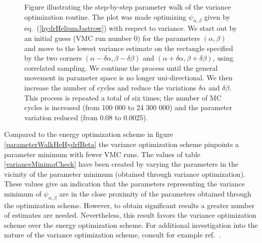 \begin{figure}[hbtp]
  
  
  \caption{ Figure illustrating the step-by-step parameter walk of the
  variance optimization routine. The plot was made optimizing
  $\psi_{\alpha,\beta}$ given by 
  eq.~(\ref{hydrHeliumJastrow}) with respect to variance.  We start out
  by an initial guess (VMC run number 0) for the parameters
  $(\alpha,\beta)$ and move to the lowest variance estimate on the
  rectangle specified by the two corners
  $(\alpha-\delta\alpha,\beta-\delta\beta)$ and
  $(\alpha+\delta\alpha,\beta+\delta\beta)$, using correlated
  sampling. We continue the process until the general movement in
  parameter space is no longer 
  uni-directional. We then increase the number of cycles and reduce
  the variations $\delta\alpha$ and $\delta\beta$. This process is
  repeated a total of six times; the number of MC cycles is increased
  (from 100 000 to 24 300 000) and the  parameter variation reduced
  (from 0.08 to 0.0025).
  }
  \label{parameterWalkHeHydrfBetaVariance}
\end{figure}

Compared to the energy optimization scheme in figure
\ref{parameterWalkHeHydrfBeta} the variance optimization scheme
pinpoints a parameter minimum with fewer VMC runs. The values of 
table \ref{varianceMinimaCheck} have been created by varying the
parameters in the vicinity of the parameter minimum (obtained through
variance optimization). These values give an indication that the 
parameters representing the variance minimum of $\psi_{\alpha,\beta}$
are in the close proximity of the parameters obtained through
the optimization scheme. However, to
obtain significant results a greater number of estimates are
needed. Nevertheless, this result favors the variance optimization
scheme over the energy optimization scheme. For additional
investigation into the nature of the variance optimization scheme,
consult for example ref.~\cite{kent1999}.
\newline

